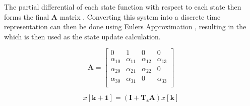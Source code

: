 \documentclass[11pt,a4paper]{article}
\begin{document}
The partial differential of each state function with respect to each state then forms the final $\boldsymbol{A}$ matrix . Converting this system into a discrete time representation can then be done using Eulers Approximation , resulting in the  which is then used as the state update calculation. \newline

\begin{equation}
    \boldsymbol{A} =
    \begin{bmatrix}
        0 & 1 & 0 & 0\\
        \alpha_{10} & \alpha_{11} & \alpha_{12} & \alpha_{13}\\
        \alpha_{20} & \alpha_{21} & \alpha_{22} & 0\\
        \alpha_{30} & \alpha_{31} & 0 & \alpha_{33}\\
    \end{bmatrix}
    \label{math:A_matrix}
\end{equation}

\begin{equation}
        x\left[\boldsymbol{k+1}\right] = \left(\boldsymbol{\boldsymbol{I}+T_s\boldsymbol{A}}\right)x\left[\boldsymbol{k}\right]
    \label{math:discrete_formula}
\end{equation}
\end{document}
